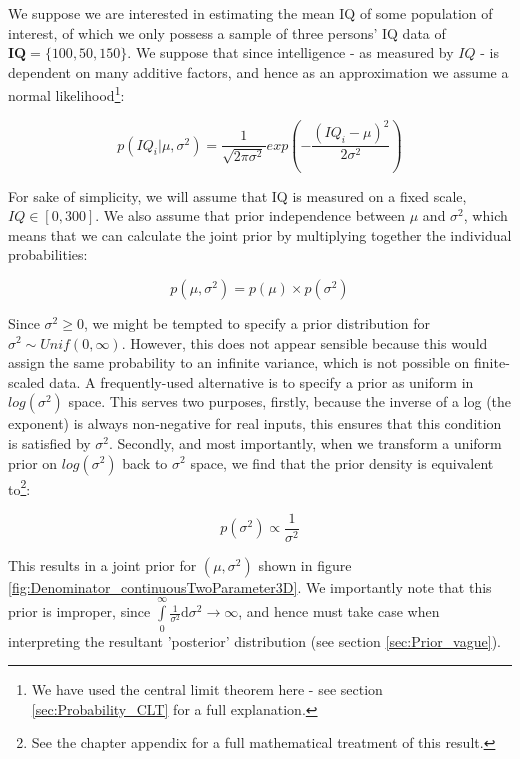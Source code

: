 \documentclass[11pt,fullpage]{book}
\begin{document}
We suppose we are interested in estimating the mean IQ of some population of interest, of which we only possess a sample of three persons' IQ data of $\boldsymbol{IQ}=\{100,50,150\}$. We suppose that since intelligence - as measured by $IQ$ - is dependent on many additive factors, and hence as an approximation we assume a normal likelihood\footnote{We have used the central limit theorem here - see section \ref{sec:Probability_CLT} for a full explanation.}:

\begin{equation}\label{eq:Denominator_continuousTwoParameterLikelihood}
p(IQ_i|\mu,\sigma^2) = \frac{1}{\sqrt{2\pi\sigma^2}} exp\left(-\frac{(IQ_i-\mu)^2}{2\sigma^2}\right)
\end{equation}

For sake of simplicity, we will assume that IQ is measured on a fixed scale, $IQ\in[0,300]$. We also assume that prior independence between $\mu$ and $\sigma^2$, which means that we can calculate the joint prior by multiplying together the individual probabilities:

\begin{equation}\label{sec:Denominator_continuousMultiparameterIndependence}
p(\mu,\sigma^2) = p(\mu) \times p(\sigma^2)
\end{equation}

Since $\sigma^2\geq 0$, we might be tempted to specify a prior distribution for $\sigma^2\sim Unif(0,\infty)$. However, this does not appear sensible because this would assign the same probability to an infinite variance, which is not possible on finite-scaled data. A frequently-used alternative is to specify a prior as uniform in $log(\sigma^2)$ space. This serves two purposes, firstly, because the inverse of a log (the exponent) is always non-negative for real inputs, this ensures that this condition is satisfied by $\sigma^2$. Secondly, and most importantly, when we transform a uniform prior on $log(\sigma^2)$ back to $\sigma^2$ space, we find that the prior density is equivalent to\footnote{See the chapter appendix for a full mathematical treatment of this result.}:

\begin{equation}\label{eq:Denominator_continuousTwoParameterPrior}
p(\sigma^2) \propto \frac{1}{\sigma^2}
\end{equation}

This results in a joint prior for $(\mu,\sigma^2)$ shown in figure \ref{fig:Denominator_continuousTwoParameter3D}. We importantly note that this prior is improper, since $\int\limits_{0}^{\infty} \frac{1}{\sigma^2}\mathrm{d}\sigma^2\rightarrow \infty$, and hence must take case when interpreting the resultant 'posterior' distribution (see section \ref{sec:Prior_vague}). 
\end{document}

